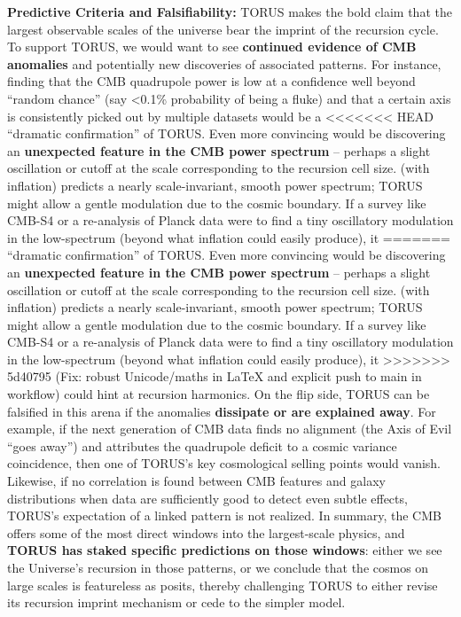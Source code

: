 \documentclass[]{article}
\begin{document}
\textbf{Predictive Criteria and Falsifiability:} TORUS makes the bold
claim that the largest observable scales of the universe bear the
imprint of the recursion cycle. To support TORUS, we would want to see
\textbf{continued evidence of CMB anomalies} and potentially new
discoveries of associated patterns. For instance, finding that the CMB
quadrupole power is low at a confidence well beyond ``random chance''
(say \textless{}0.1\% probability of being a fluke) and that a certain
axis is consistently picked out by multiple datasets would be a
<<<<<<< HEAD
``dramatic confirmation'' of TORUS\hspace{0pt}. Even more convincing
would be discovering an \textbf{unexpected feature in the CMB power
spectrum} -- perhaps a slight oscillation or cutoff at the scale
corresponding to the recursion cell size. \LambdaCDM (with inflation) predicts
a nearly scale-invariant, smooth power spectrum; TORUS might allow a
gentle modulation due to the cosmic boundary. If a survey like CMB-S4 or
a re-analysis of Planck data were to find a tiny oscillatory modulation
in the low-\ell spectrum (beyond what inflation could easily produce), it
=======
``dramatic confirmation'' of TORUS​. Even more convincing would be
discovering an \textbf{unexpected feature in the CMB power spectrum} --
perhaps a slight oscillation or cutoff at the scale corresponding to the
recursion cell size. \LambdaCDM (with inflation) predicts a nearly
scale-invariant, smooth power spectrum; TORUS might allow a gentle
modulation due to the cosmic boundary. If a survey like CMB-S4 or a
re-analysis of Planck data were to find a tiny oscillatory modulation in
the low-\ell spectrum (beyond what inflation could easily produce), it
>>>>>>> 5d40795 (Fix: robust Unicode/maths in LaTeX and explicit push to main in workflow)
could hint at recursion harmonics. On the flip side, TORUS can be
falsified in this arena if the anomalies \textbf{dissipate or are
explained away}. For example, if the next generation of CMB data finds
no alignment (the Axis of Evil ``goes away'') and attributes the
quadrupole deficit to a cosmic variance coincidence, then one of TORUS's
key cosmological selling points would vanish. Likewise, if no
correlation is found between CMB features and galaxy distributions when
data are sufficiently good to detect even subtle effects, TORUS's
expectation of a linked pattern is not realized. In summary, the CMB
offers some of the most direct windows into the largest-scale physics,
and \textbf{TORUS has staked specific predictions on those windows}:
either we see the Universe's recursion in those patterns, or we conclude
that the cosmos on large scales is featureless as \LambdaCDM posits, thereby
challenging TORUS to either revise its recursion imprint mechanism or
cede to the simpler model.
\end{document}
